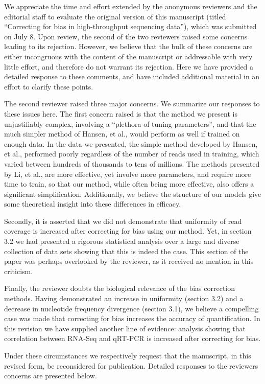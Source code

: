 \documentclass{article}
\begin{document}
We appreciate the time and effort extended by the anonymous reviewers and the
editorial staff to evaluate the original version of this manuscript (titled
``Correcting for bias in high-throughput sequencing data''), which was submitted
on July 8. Upon review, the second of the two reviewers raised some concerns
leading to its rejection. However, we believe that the bulk of these concerns
are either incongruous with the content of the manuscript or addressable with
very little effort, and therefore do not warrant its rejection.  Here we have
provided a detailed response to these comments, and have included additional
material in an effort to clarify these points.

The second reviewer raised three major concerns. We summarize our
responses to these issues here.  The first concern raised is
that the method we present is unjustifiably complex, involving a ``plethora of
tuning parameters'', and that the much simpler method of Hansen, et al., would
perform as well if trained on enough data.  In the data we presented, the simple
method developed by Hansen, et al., performed poorly regardless of the number of
reads used in training, which varied between hundreds of thousands to tens of
millions.  The methods presented by Li, et al., are more effective, yet involve
more parameters, and require more time to train, so that our method, while often
being more effective, also offers a significant simplification.
Additionally, we believe the structure of our models give some
theoretical insight into these differences in efficacy.

Secondly, it is asserted that we did not demonstrate that uniformity of read
coverage is increased after correcting for bias using our method.  Yet, in
section 3.2 we had presented a rigorous statistical analysis over a large and
diverse collection of data sets showing that this is indeed the case. This
section of the paper was perhaps overlooked by the reviewer, as it received
no mention in this criticism.

Finally, the reviewer doubts the biological relevance of the bias correction
methods. Having demonstrated an increase in uniformity (section 3.2) and a
decrease in nucleotide frequency divergence (section 3.1), we believe a
compelling case was made that correcting for bias increases the accuracy of
quantification. In this revision we have supplied another line of evidence:
analysis showing that correlation between RNA-Seq and qRT-PCR is increased after
correcting for bias.

Under these circumstances we respectively request that the manuscript, in this
revised form, be reconsidered for publication.  Detailed responses to
the reviewers concerns are presented below.
\end{document}
